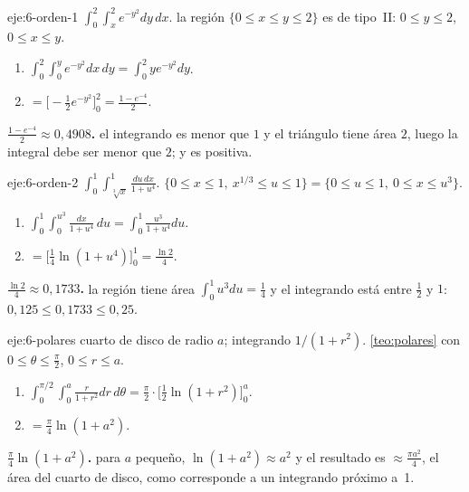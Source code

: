 \begin{solucion}{eje:6-orden-1}
\datos $\int_0^2\int_x^2e^{-y^2}dy\,dx$.
\planteamiento la región $\{0\le x\le y\le2\}$ es de tipo~II: $0\le y\le2$, $0\le x\le y$.
\pasos
\begin{enumerate}[label=\arabic*.]
  \item $\int_0^2\int_0^ye^{-y^2}dx\,dy=\int_0^2ye^{-y^2}dy$.
  \item $=\bigl[-\frac12e^{-y^2}\bigr]_0^2=\frac{1-e^{-4}}{2}$.
\end{enumerate}
\resultado \textbf{$\frac{1-e^{-4}}{2}\approx0{,}4908$.}
\comprobacion el integrando es menor que $1$ y el triángulo tiene área $2$, luego la integral debe ser menor que $2$; y es positiva.
\end{solucion}

\begin{solucion}{eje:6-orden-2}
\datos $\int_0^1\int_{\sqrt[3]x}^{1}\frac{du\,dx}{1+u^4}$.
\planteamiento $\{0\le x\le1,\ x^{1/3}\le u\le1\}=\{0\le u\le1,\ 0\le x\le u^3\}$.
\pasos
\begin{enumerate}[label=\arabic*.]
  \item $\int_0^1\int_0^{u^3}\frac{dx}{1+u^4}\,du=\int_0^1\frac{u^3}{1+u^4}du$.
  \item $=\bigl[\frac14\ln(1+u^4)\bigr]_0^1=\frac{\ln2}4$.
\end{enumerate}
\resultado \textbf{$\frac{\ln2}{4}\approx0{,}1733$.}
\comprobacion la región tiene área $\int_0^1u^3du=\frac14$ y el integrando está entre $\frac12$ y $1$: $0{,}125\le0{,}1733\le0{,}25$.
\end{solucion}

\begin{solucion}{eje:6-polares}
\datos cuarto de disco de radio $a$; integrando $1/(1+r^2)$.
\planteamiento \cref{teo:polares} con $0\le\theta\le\frac\pi2$, $0\le r\le a$.
\pasos
\begin{enumerate}[label=\arabic*.]
  \item $\int_0^{\pi/2}\int_0^a\frac{r}{1+r^2}dr\,d\theta=\frac\pi2\cdot\bigl[\frac12\ln(1+r^2)\bigr]_0^a$.
  \item $=\frac\pi4\ln(1+a^2)$.
\end{enumerate}
\resultado \textbf{$\frac\pi4\ln(1+a^2)$.}
\comprobacion para $a$ pequeño, $\ln(1+a^2)\approx a^2$ y el resultado es $\approx\frac{\pi a^2}{4}$, el área del cuarto de disco, como corresponde a un integrando próximo a~1.
\end{solucion}

